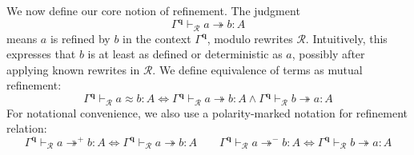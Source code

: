 \documentclass[acmsmall,screen,review]{acmart}
\newcommand{\mc}[1]{\ensuremath{\mathcal{#1}}}
\newcommand{\mb}[1]{\ensuremath{\mathbf{#1}}}
\newcommand{\teqv}{\approx}
\newcommand{\tref}{\twoheadrightarrow}
\newcommand{\tmle}[5]{#1 \vdash_{#2} #3 \tref #4 : {#5}}
\newcommand{\tmlep}[6]{#1 \vdash_{#2} #3 \tref^{#6} #4 : {#5}}
\newcommand{\tmeq}[5]{#1 \vdash_{#2} #3 \teqv #4 : {#5}}
\begin{document}
We now define our core notion of refinement. The judgment
\begin{equation*}
  \tmle{\Gamma^{\mb{q}}}{\mc{R}}{a}{b}{A}
\end{equation*}
means  $a$ is refined by $b$ in the context $\Gamma^{\mb{q}}$, modulo rewrites
$\mc{R}$. Intuitively, this expresses that $b$ is at least as defined or deterministic as $a$,
possibly after applying known rewrites in $\mc{R}$. We define equivalence of terms as mutual
refinement:
\begin{equation}
  \tmeq{\Gamma^{\mb{q}}}{\mc{R}}{a}{b}{A}
  \iff \tmle{\Gamma^{\mb{q}}}{\mc{R}}{a}{b}{A} 
  \land \tmle{\Gamma^{\mb{q}}}{\mc{R}}{b}{a}{A}
\end{equation}
For notational convenience, we also use a polarity-marked notation
for refinement relation:
\begin{equation*}
  \tmlep{\Gamma^{\mb{q}}}{\mc{R}}{a}{b}{A}{+} \iff \tmle{\Gamma^{\mb{q}}}{\mc{R}}{a}{b}{A} \qquad
  \tmlep{\Gamma^{\mb{q}}}{\mc{R}}{a}{b}{A}{-} \iff \tmle{\Gamma^{\mb{q}}}{\mc{R}}{b}{a}{A}
\end{equation*}
\end{document}
